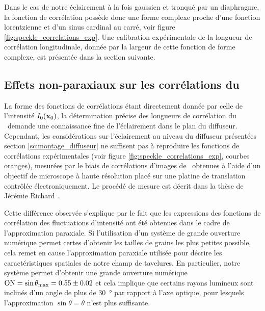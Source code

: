 Dans le cas de notre éclairement à la fois gaussien et tronqué par un diaphragme, la fonction de corrélation possède donc une forme complexe proche d'une fonction lorentzienne et d'un sinus cardinal au carré, voir figure \ref{fig:speckle_correlations_exp}. Une calibration expérimentale de la longueur de corrélation longitudinale, donnée par la largeur de cette fonction de forme complexe, est présentée dans la section suivante.


















\subsection{Effets non-paraxiaux sur les corrélations du \speckle\ }
\label{sc:speckle_non_paraxial}

La forme des fonctions de corrélations étant directement donnée par celle de l'intensité $I_0(\mathbf{x}_0)$, la détermination précise des longueurs de corrélation du \speckle\ demande une connaissance fine de l'éclairement dans le plan du diffuseur. Cependant, les considérations sur l'éclairement au niveau du diffuseur présentées section \ref{sc:montage_diffuseur} ne suffisent pas à reproduire les fonctions de corrélations expérimentales (voir figure \ref{fig:speckle_correlations_exp}, courbes oranges), mesurées par le biais de corrélations d'images de \speckle\ obtenues à l'aide d'un objectif de microscope à haute résolution placé sur une platine de translation contrôlée électroniquement. Le procédé de mesure est décrit dans la thèse de Jérémie Richard \citep{richard2015propagation}. 

Cette différence observée s'explique par le fait que les expressions des fonctions de corrélation des fluctuations d'intensité ont été obtenues dans le cadre de l'approximation paraxiale. Si l'utilisation d'un système de grande ouverture numérique permet certes d'obtenir les tailles de grains les plus petites possible, cela remet en cause l'approximation paraxiale utilisée pour décrire les caractéristiques spatiales de notre champ de tavelures. En particulier, notre système permet d'obtenir une grande ouverture numérique $\mathrm{ON}=\sin{\theta_{\mathrm{max}}}=0.55\pm 0.02$ et cela implique que certains rayons lumineux sont inclinés d'un angle de plus de \SI{30}{\degree} par rapport à l'axe optique, pour lesquels l'approximation $\sin{\theta}=\theta$ n'est plus suffisante.


